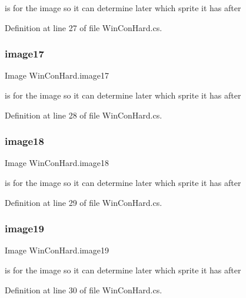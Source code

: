 is for the image so it can determine later which sprite it has after 

Definition at line 27 of file Win\+Con\+Hard.\+cs.

\mbox{\label{class_win_con_hard_aa7029fd9d2463eea8f2a4edd5244a31f}} 
\subsubsection{\texorpdfstring{image17}{image17}}
{\footnotesize\ttfamily Image Win\+Con\+Hard.\+image17}

is for the image so it can determine later which sprite it has after 

Definition at line 28 of file Win\+Con\+Hard.\+cs.

\mbox{\label{class_win_con_hard_a17ce105251685494ab063f0dacc543af}} 
\subsubsection{\texorpdfstring{image18}{image18}}
{\footnotesize\ttfamily Image Win\+Con\+Hard.\+image18}

is for the image so it can determine later which sprite it has after 

Definition at line 29 of file Win\+Con\+Hard.\+cs.

\mbox{\label{class_win_con_hard_aba965d1c8a0fffc4b2fac7f025ee04d9}} 
\subsubsection{\texorpdfstring{image19}{image19}}
{\footnotesize\ttfamily Image Win\+Con\+Hard.\+image19}

is for the image so it can determine later which sprite it has after 

Definition at line 30 of file Win\+Con\+Hard.\+cs.

\mbox{\label{class_win_con_hard_a035513335d3a18e58ae22fc0c935f2f7}} 
